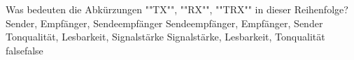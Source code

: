     {Was bedeuten die Abkürzungen ""TX"", ""RX"", ""TRX"" in dieser Reihenfolge?}
    {Sender, Empfänger, Sendeempfänger }
    {Sendeempfänger, Empfänger, Sender}
    {Tonqualität, Lesbarkeit, Signalstärke}
    {Signalstärke, Lesbarkeit, Tonqualität}
    {false}{false}